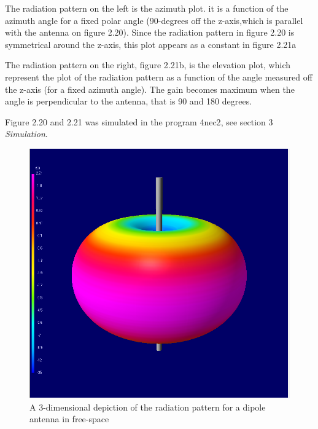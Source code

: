 The radiation pattern on the left is the azimuth plot. it is a function of the azimuth angle for a fixed polar angle (90-degrees off the z-axis,which is parallel with the antenna on figure 2.20). Since the radiation pattern in figure 2.20 is symmetrical around the z-axis, this plot appears as a constant in figure 2.21a

The radiation pattern on the right, figure 2.21b, is the elevation plot, which represent the plot of the radiation pattern as a function of the angle measured off the z-axis (for a fixed azimuth angle). The gain becomes maximum when the angle is perpendicular to the antenna, that is 90 and 180 degrees.

Figure 2.20 and 2.21 was simulated in the program 4nec2\cite{4nec2}, see section 3 \textit{Simulation}. 

\begin{figure}[h]
\centering
\includegraphics[scale=0.5]{figures/DipoleAntennaRad.PNG}
\caption{A 3-dimensional depiction of the radiation pattern for a dipole antenna in free-space}
\end{figure}

